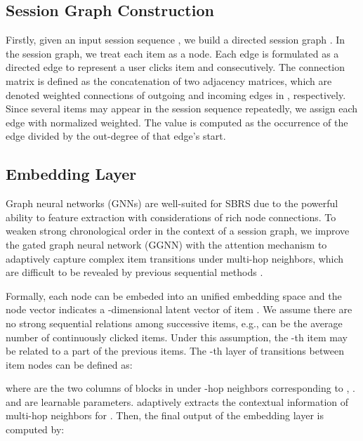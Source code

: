\documentclass[runningheads]{llncs}
\begin{document}
\subsection{Session Graph Construction}
Firstly, given an input session sequence , we build a directed session graph .
In the session graph, we treat each item  as a node. 
Each edge  is formulated as a directed edge to represent a user clicks item  and  consecutively. 
The connection matrix  is defined as the concatenation of two adjacency matrices, which are denoted weighted connections of outgoing and incoming edges in , respectively.  
Since several items may appear in the session sequence repeatedly, we assign each edge with normalized weighted. The value is computed as the occurrence of the edge divided by the out-degree of that edge's start. 




\subsection{Embedding Layer}
Graph neural networks (GNNs) \cite{DBLP:journals/corr/LiTBZ15,DBLP:journals/tnn/ScarselliGTHM09,DBLP:conf/iclr/VelickovicCCRLB18} are well-suited for SBRS due to the powerful ability to feature extraction with considerations of rich node connections.
To weaken strong chronological order in the context of a session graph, we improve the gated graph neural network (GGNN) \cite{DBLP:journals/corr/LiTBZ15} with the attention mechanism to adaptively capture complex item transitions under multi-hop neighbors, which are difficult to be revealed by previous sequential methods \cite{DBLP:conf/www/RendleFS10,DBLP:journals/corr/HidasiKBT15,DBLP:conf/cikm/LiRCRLM17,DBLP:conf/sigir/WangRMCMR19,DBLP:conf/kdd/LiuZMZ18}.


Formally, each node  can be embeded into an unified embedding space and the node vector  indicates a -dimensional latent vector of item . 
We assume there are no strong sequential relations among  successive items, e.g.,  can be the average number of continuously clicked items. Under this assumption, the -th item may be related to a part of the previous  items. The -th layer of transitions between item nodes can be defined as:

where  are the two columns of blocks in  under -hop neighbors corresponding to , .
 and  are learnable parameters.
 adaptively extracts the contextual information of multi-hop neighbors for .
Then, the final output  of the embedding layer is computed by:
 
\end{document}
